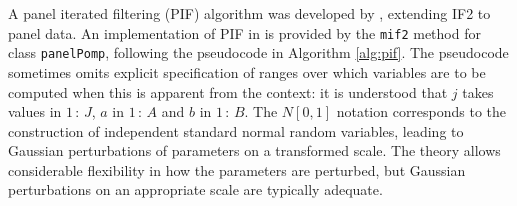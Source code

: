A panel iterated filtering (PIF) algorithm was developed by \citet{breto20}, extending IF2 to panel data.
An implementation of PIF in  is provided by the \texttt{mif2} method for class \texttt{panelPomp}, following the pseudocode in Algorithm \ref{alg:pif}.
The pseudocode sometimes omits explicit specification of ranges over which variables are to be computed when this is apparent from the context:
it is understood that \(j\) takes values in \(1\,{:}\,J\), \(a\) in \(1\,{:}\,A\) and \(b\) in \(1\,{:}\,B\).
The \(N[0,1]\) notation corresponds to the construction of independent standard normal random variables, leading to Gaussian perturbations of parameters on a transformed scale.
The theory allows considerable flexibility in how the parameters are perturbed, but Gaussian perturbations on an appropriate scale are typically adequate.

